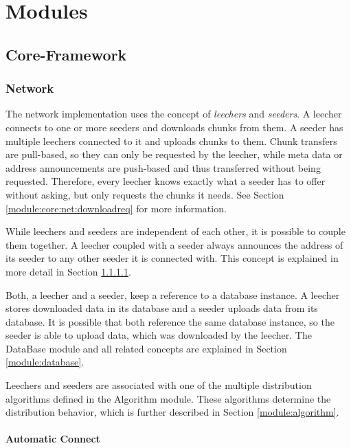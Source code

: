 
\chapter{Modules}
\label{module}

\section{Core-Framework}
\label{module:core}

\subsection{Network}
\label{module:core:net}
The network implementation uses the concept of \emph{leechers} and \emph{seeders}. A leecher connects to one or more seeders and downloads chunks from them. A seeder has multiple leechers connected to it and uploads chunks to them. Chunk transfers are pull-based, so they can only be requested by the leecher, while meta data or address announcements are push-based and thus transferred without being requested. Therefore, every leecher knows exactly what a seeder has to offer without asking, but only requests the chunks it needs. See Section \ref{module:core:net:downloadreq} for more information.

While leechers and seeders are independent of each other, it is possible to couple them together. A leecher coupled with a seeder always announces the address of its seeder to any other seeder it is connected with. This concept is explained in more detail in Section \ref{module:core:net:autoconnect}.

Both, a leecher and a seeder, keep a reference to a database instance. A leecher stores downloaded data in its database and a seeder uploads data from its database. It is possible that both reference the same database instance, so the seeder is able to upload data, which was downloaded by the leecher. The DataBase module and all related concepts are explained in Section \ref{module:database}.

Leechers and seeders are associated with one of the multiple distribution algorithms defined in the Algorithm module. These algorithms determine the distribution behavior, which is further described in Section \ref{module:algorithm}.


\subsubsection{Automatic Connect}
\label{module:core:net:autoconnect}




